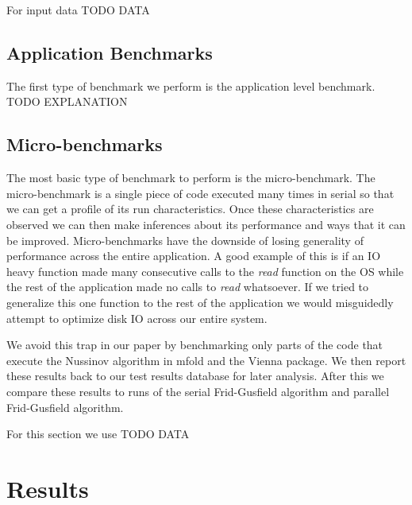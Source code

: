 \documentclass[12pt]{article}
\begin{document}
\par For input data TODO DATA
\subsection{Application Benchmarks}
The first type of benchmark we perform is the application level benchmark. TODO EXPLANATION

\subsection{Micro-benchmarks}
\par The most basic type of benchmark to perform is the micro-benchmark. The micro-benchmark is a single piece of code executed many times in serial so that we can get a profile of its run characteristics\cite{eulogy,sysperformance}. Once these characteristics are observed we can then make inferences about its performance and ways that it can be improved. Micro-benchmarks have the downside of losing generality of performance across the entire application\cite{eulogy, sysperformance}. A good example of this is if an IO heavy function made many consecutive calls to the \textit{read} function on the OS while the rest of the application made no calls to \textit{read} whatsoever. If we tried to generalize this one function to the rest of the application we would misguidedly attempt to optimize disk IO across our entire system.
\par We avoid this trap in our paper by benchmarking only parts of the code that execute the Nussinov algorithm in mfold and the Vienna package. We then report these results back to our test results database for later analysis. After this we compare these results to runs of the serial Frid-Gusfield algorithm and parallel Frid-Gusfield algorithm.
\par For this section we use TODO DATA

\section{Results}
\end{document}

